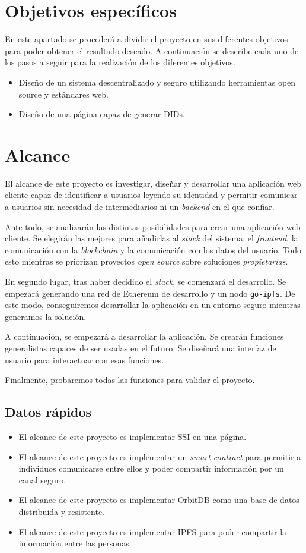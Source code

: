\section{Objetivos específicos}
En este apartado se procederá a dividir el proyecto en sus diferentes objetivos para poder
obtener el resultado deseado. A continuación se describe cada uno de los pasos a seguir para la realización de los diferentes objetivos.
\begin{itemize}
    \item Diseño de un sistema descentralizado y seguro utilizando herramientas open source y estándares web.
    \item Diseño de una página capaz de generar DIDs.
\end{itemize}
\section{Alcance}
El alcance de este proyecto es investigar, diseñar y desarrollar una aplicación web cliente capaz de identificar a usuarios leyendo su identidad y permitir comunicar a usuarios sin necesidad de intermediarios ni un \textit{backend} en el que confiar.

Ante todo, se analizarán las distintas posibilidades para crear una aplicación web cliente. Se elegirán las mejores para añadirlas al \textit{stack} del sistema: el \textit{frontend}, la comunicación con la \textit{blockchain} y la comunicación con los datos del usuario. Todo esto mientras se priorizan proyectos \textit{open source} sobre soluciones \textit{propietarias}.

En segundo lugar, tras haber decidido el \textit{stack}, se comenzará el desarrollo. Se empezará generando una red de Ethereum de desarrollo y un nodo \verb|go-ipfs|. De este modo, conseguiremos desarrollar la aplicación en un entorno seguro mientras generamos la solución.

A continuación, se empezará a desarrollar la aplicación. Se crearán funciones generalistas capaces de ser usadas en el futuro. Se diseñará una interfaz de usuario para interactuar con esas funciones.

Finalmente, probaremos todas las funciones para validar el proyecto.
\subsection{Datos rápidos}
\begin{itemize}
    \item El alcance de este proyecto es implementar SSI en una página.
    \item El alcance de este proyecto es implementar un \textit{smart contract} para permitir a individuos comunicarse entre ellos y poder compartir información por un canal seguro.
    \item El alcance de este proyecto es implementar OrbitDB como una base de datos distribuida y resistente.
    \item El alcance de este proyecto es implementar IPFS para poder compartir la información entre las personas.
\end{itemize}
